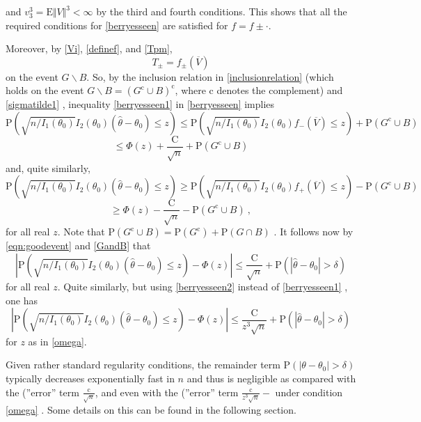 and $ v_{3}^{3}=\mathrm{E}\Vert V\Vert^{3}<\infty$ by the third and fourth conditions. This shows that all the required conditions for \eqref{berryesseen} are satisfied for $ f=f\pm\cdot$.

Moreover, by \eqref{Vi}, \eqref{definef}, and \eqref{Tpm},
$$
T_{\pm}=f_{\pm}(\overline{V})
$$
on the event $G\backslash B$. So, by the inclusion relation in \eqref{inclusionrelation} (which holds on the event $G\backslash B=(G^{\mathrm{c}}\cup B)^{\mathrm{c}}$, where $\mathrm{c}$ denotes the complement) and \eqref{sigmatilde1} , inequality \eqref{berryesseen1} in \ref{berryesseen} implies
$$
\mathrm{P}(\sqrt{n/I_1(\theta_{0})}I_2(\theta_0)(\hat{\theta}-\theta_{0})\leq z)\leq \mathrm{P}(\sqrt{n/I_1(\theta_{0})}I_2(\theta_0)f_{-}(\overline{V})\leq z)+\mathrm{P}(G^{\mathrm{c}}\cup B)
$$
$$
\leq\Phi(z)+\frac{\mathrm{C}}{\sqrt{n}}+\mathrm{P}(G^{\mathrm{c}}\cup B)
$$
and, quite similarly,
$$
\mathrm{P}(\sqrt{n/I_1(\theta_{0})}I_2(\theta_0)(\hat{\theta}-\theta_{0})\leq z)\geq \mathrm{P}(\sqrt{n/I_1(\theta_{0})}I_2(\theta_0)f_{+}(\overline{V})\leq z)-\mathrm{P}(G^{\mathrm{c}}\cup B)
$$
$$
\geq\Phi(z)-\frac{\mathrm{C}}{\sqrt{n}}-\mathrm{P}(G^{\mathrm{c}}\cup B)\ ,
$$
for all real $z$. Note that $\mathrm{P}(G^{\mathrm{c}}\cup B)=\mathrm{P}(G^{\mathrm{c}})+\mathrm{P}(G\cap B)$ . It follows now by \eqref{eqn:goodevent} and \eqref{GandB} that
\begin{equation}
|\displaystyle \mathrm{P}(\sqrt{n/I_1(\theta_{0})}I_2(\theta_0)(\hat{\theta}-\theta_{0})\leq z)-\Phi(z)|\leq\frac{\mathrm{C}}{\sqrt{n}}+\mathrm{P}(|\hat{\theta}-\theta_{0}|>\delta)
\end{equation}
for all real $z$. Quite similarly, but using \eqref{berryesseen2} instead of \eqref{berryesseen1} , one has
\begin{equation}
|\displaystyle \mathrm{P}(\sqrt{n/I_1(\theta_{0})}I_2(\theta_0)(\hat{\theta}-\theta_{0})\leq z)-\Phi(z)|\leq\frac{\mathrm{C}}{z^{3}\sqrt{n}}+\mathrm{P}(|\hat{\theta}-\theta_{0}|>\delta)
\end{equation}
for $z$ as in \eqref{omega}.

Given rather standard regularity conditions, the remainder term $\mathrm{P}(|\theta-\theta_{0}|>\delta)$ typically decreases exponentially fast in $n$ and thus is negligible as compared with the (''error'' term $\displaystyle \frac{\mathrm{c}}{\sqrt{n}}$, and even with the (''error'' term $\displaystyle \frac{\mathrm{c}}{z^{3}\sqrt{n}}-$ under condition \eqref{omega} . Some details on this can be found in the following section.

